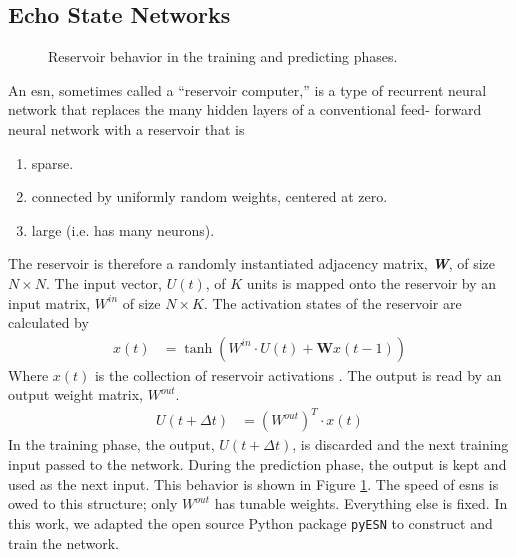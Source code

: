 \subsection{Echo State Networks}

\begin{figure}[htp]
  \centering


  \caption{Reservoir behavior in the training and predicting phases.}
  \label{fig:reservoir_graph}
\end{figure}

An \gls{esn}, sometimes called a ``reservoir computer,''\cite{pathak_using_2017, pathak_model-free_2018, vlachas_backpropagation_2020} is a type of recurrent
neural network that replaces the many hidden layers of a conventional feed-
forward neural network with a reservoir that is
\begin{enumerate}
  \item sparse.
  \item connected by uniformly random weights, centered at zero.
  \item large (i.e. has many neurons).
\end{enumerate}

The reservoir is therefore a randomly instantiated adjacency matrix,
\textit{\textbf{W}}, of size $N \times N$. The input vector, $U(t)$, of
$K$ units is mapped onto the reservoir by an input matrix,
 $W^{in}$ of size $N \times K$. The activation states of the reservoir are calculated by
 \begin{align}
   x(t) &= \tanh \left(W^{in}\cdot U(t) + \mathbf{W}x(t-1)\right)
 \end{align}
 Where $x(t)$ is the collection of reservoir activations \cite{shi_energy_2016, pathak_model-free_2018, lukosevicius_practical_2012}.
 The output is read by an output weight matrix,
 $W^{out}$.
 \begin{align}
   U(t+\Delta t) &= \left(W^{out}\right)^T\cdot x(t)
 \end{align}
 In the training phase, the output, $U(t+\Delta t)$, is
 discarded and the next training input passed to the network. During the
 prediction phase, the output is kept and used as the next input. This behavior
 is shown in Figure \ref{fig:reservoir_graph}. The speed of \glspl{esn} is owed
 to this structure; only $W^{out}$ has tunable weights. Everything else is
 fixed. In this work, we adapted the open source Python package \texttt{pyESN} \cite{korndorfer_pyesn_2015} to construct and train the network.

